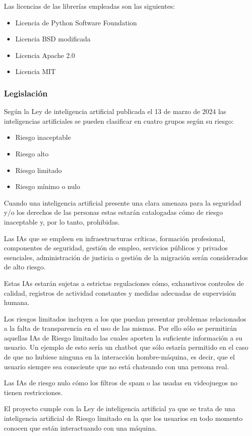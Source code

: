 Las licencias de las librerías empleadas son las siguientes:

\begin{itemize}

    \item Licencia de Python Software Foundation
    \item Licencia BSD modificada
    \item Licencia Apache 2.0
    \item Licencia MIT

\end{itemize}

\subsubsection{Legislación}

Según la Ley de inteligencia artificial publicada el 13 de marzo de 2024 las inteligencias artificiales se pueden clasificar en cuatro grupos según su riesgo:

\begin{itemize}

    \item Riesgo inaceptable
    \item Riesgo alto
    \item Riesgo limitado
    \item Riesgo mínimo o nulo

\end{itemize}

Cuando una inteligencia artificial presente una clara amenaza para la seguridad y/o los derechos de las personas estas estarán catalogadas cómo de riesgo inaceptable y, por lo tanto, prohibidas.

Las IAs que se empleen en infraestructuras críticas, formación profesional, componentes de seguridad, gestión de empleo, servicios públicos y privados esenciales, administración de justicia o gestión de la migración serán considerados de alto riesgo.

Estas IAs estarán sujetas a estrictas regulaciones cómo, exhaustivos controles de calidad, registros de actividad constantes y medidas adecuadas de supervisión humana.

Los riesgos limitados incluyen a los que puedan presentar problemas relacionados a la falta de transparencia en el uso de las mismas. Por ello sólo se permitirán aquellas IAs de Riesgo limitado las cuales aporten la suficiente información a su usuario.
Un ejemplo de esto sería un chatbot que sólo estaría permitido en el caso de que no hubiese ninguna en la interacción hombre-máquina, es decir, que el usuario siempre sea consciente que no está chateando con una persona real.

Las IAs de riesgo nulo cómo los filtros de spam o las usadas en videojuegos no tienen restricciones.

El proyecto cumple con la Ley de inteligencia artificial ya que se trata de una inteligencia artificial de Riesgo limitado en la que los usuarios en todo momento conocen que están interactuando con una máquina. %

